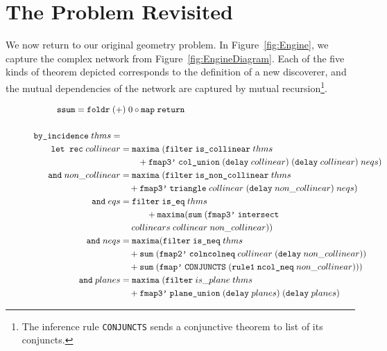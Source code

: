 \section{The Problem Revisited}\label{sec:Solution}
We now return to our original geometry problem. In Figure~\ref{fig:Engine}, we capture the complex network from Figure~\ref{fig:EngineDiagram}. Each of the five kinds of theorem depicted corresponds to the definition of a new discoverer, and the mutual dependencies of the network are captured by mutual recursion\footnote{The inference rule \texttt{CONJUNCTS} sends a conjunctive theorem to list of its conjuncts.}.
\begin{figure}
\scriptsize
\begin{align*}
&\hspace{-2.55cm}\code{ssum} = \code{foldr}\;(+)\; 0\circ \code{map}\;\code{return}\\\\
\texttt{by\_incidence}\;thms = \\
\quad \texttt{let rec}\;collinear &= \texttt{maxima}\;(\texttt{filter}\;\texttt{is\_collinear}\;thms\\
&\qquad + \texttt{fmap3'}\;\texttt{col\_union}\;(\texttt{delay}\;collinear)\;(\texttt{delay}\;collinear)\;neqs)\\
\texttt{and}\;non\_collinear &= \texttt{maxima}\;(\texttt{filter}\;\texttt{is\_non\_collinear}\;thms\\
&\quad + \texttt{fmap3'}\;\texttt{triangle}\;collinear\;(\texttt{delay}\;non\_collinear)\;neqs)\\
\texttt{and}\;eqs &= \texttt{filter}\;\texttt{is\_eq}\;thms\\
&\quad\qquad+ \texttt{maxima} (\texttt{sum}\;(\texttt{fmap3'}\;\texttt{intersect}\\
&\quad\;collinears\;collinear\;non\_collinear))\\
\texttt{and}\;neqs &= \texttt{maxima} (\texttt{filter}\;\texttt{is\_neq}\;thms\\
&\quad + \texttt{sum}\;(\texttt{fmap2'}\;\texttt{colncolneq}\;collinear\;(\texttt{delay}\;non\_collinear))\\
&\quad + \texttt{sum}\;(\texttt{fmap'}\;\texttt{CONJUNCTS}\;(\texttt{rule1}\;\texttt{ncol\_neq}\;non\_collinear)))\\
\texttt{and}\;planes &= \texttt{maxima}\;(\texttt{filter}\;is\_plane\;thms\\
&\quad + \texttt{fmap3'}\;\texttt{plane\_union}\;(\texttt{delay}\;planes)\;(\texttt{delay}\;planes)\\

\end{align*}
\end{figure}
